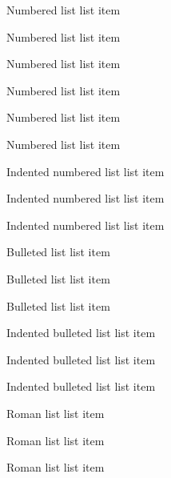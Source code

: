 \begin{numberedlist}
	\item Numbered list list item
    \item Numbered list list item
    \item Numbered list list item
\end{numberedlist}

\begin{numberedlist}
	\item Numbered list list item
    \item Numbered list list item
    \item Numbered list list item
\end{numberedlist}

\begin{numberedlist-indent}
	\item Indented numbered list list item
	\item Indented numbered list list item
	\item Indented numbered list list item
\end{numberedlist-indent}

\begin{bulletlist}
	\item Bulleted list list item
    \item Bulleted list list item
    \item Bulleted list list item
\end{bulletlist}

\begin{bulletlist-indent}
    \item Indented bulleted list list item
    \item Indented bulleted list list item
    \item Indented bulleted list list item
\end{bulletlist-indent}

\begin{romanlist}
    \item Roman list list item
    \item Roman list list item
    \item Roman list list item
\end{romanlist}

